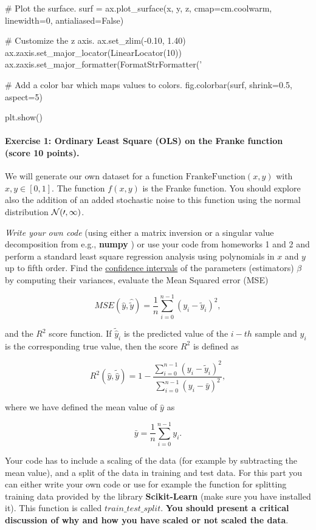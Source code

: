 \documentclass[%
oneside,                 %
final,                   %
10pt]{article}
\begin{document}
# Plot the surface.
surf = ax.plot_surface(x, y, z, cmap=cm.coolwarm,
                       linewidth=0, antialiased=False)

# Customize the z axis.
ax.set_zlim(-0.10, 1.40)
ax.zaxis.set_major_locator(LinearLocator(10))
ax.zaxis.set_major_formatter(FormatStrFormatter('%

# Add a color bar which maps values to colors.
fig.colorbar(surf, shrink=0.5, aspect=5)

plt.show()

\epycod


\paragraph{Exercise 1: Ordinary Least Square (OLS) on the Franke function (score 10 points).}
We will generate our own dataset for a function
$\mathrm{FrankeFunction}(x,y)$ with $x,y \in [0,1]$. The function
$f(x,y)$ is the Franke function. You should explore also the addition
of an added stochastic noise to this function using the normal
distribution $\cal{N}(0,1)$.

\emph{Write your own code} (using either a matrix inversion or a singular
value decomposition from e.g., \textbf{numpy} ) or use your code from
homeworks 1 and 2 and perform a standard least square regression
analysis using polynomials in $x$ and $y$ up to fifth order. Find the
\href{{https://en.wikipedia.org/wiki/Confidence_interval}}{confidence intervals} of the parameters (estimators) $\beta$ by computing their
variances, evaluate the Mean Squared error (MSE)

\[ MSE(\hat{y},\hat{\tilde{y}}) = \frac{1}{n}
\sum_{i=0}^{n-1}(y_i-\tilde{y}_i)^2, 
\] 

and the $R^2$ score function.  If $\tilde{\hat{y}}_i$ is the predicted
value of the $i-th$ sample and $y_i$ is the corresponding true value,
then the score $R^2$ is defined as

\[
R^2(\hat{y}, \tilde{\hat{y}}) = 1 - \frac{\sum_{i=0}^{n - 1} (y_i - \tilde{y}_i)^2}{\sum_{i=0}^{n - 1} (y_i - \bar{y})^2},
\]

where we have defined the mean value  of $\hat{y}$ as

\[
\bar{y} =  \frac{1}{n} \sum_{i=0}^{n - 1} y_i.
\]

Your code has to include a scaling of the data (for example by
subtracting the mean value), and
a split of the data in training and test data. For this part you can
either write your own code or use for example the function for
splitting training data provided by the library \textbf{Scikit-Learn} (make
sure you have installed it).  This function is called
$train\_test\_split$.  \textbf{You should present a critical discussion of why and how you have scaled or not scaled the data}.
\end{document}
